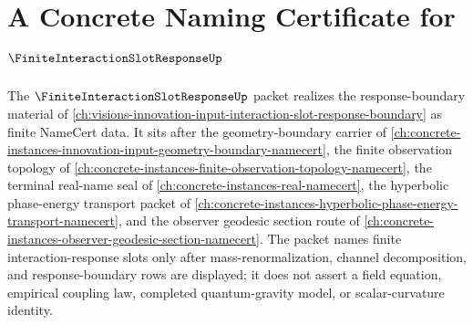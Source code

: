 \chapter{A Concrete Naming Certificate for $\FiniteInteractionSlotResponseUp$}
\label{ch:concrete-instances-finite-interaction-slot-response-namecert}

The $\FiniteInteractionSlotResponseUp$ packet realizes the response-boundary material of \autoref{ch:visions-innovation-input-interaction-slot-response-boundary} as finite NameCert data. It sits after the geometry-boundary carrier of \autoref{ch:concrete-instances-innovation-input-geometry-boundary-namecert}, the finite observation topology of \autoref{ch:concrete-instances-finite-observation-topology-namecert}, the terminal real-name seal of \autoref{ch:concrete-instances-real-namecert}, the hyperbolic phase-energy transport packet of \autoref{ch:concrete-instances-hyperbolic-phase-energy-transport-namecert}, and the observer geodesic section route of \autoref{ch:concrete-instances-observer-geodesic-section-namecert}. The packet names finite interaction-response slots only after mass-renormalization, channel decomposition, and response-boundary rows are displayed; it does not assert a field equation, empirical coupling law, completed quantum-gravity model, or scalar-curvature identity.

